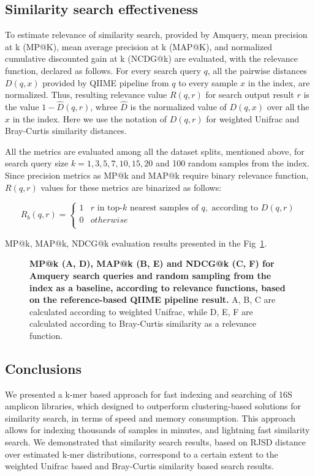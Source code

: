 \documentclass[10pt,letterpaper]{article}
\begin{document}
\subsection*{Similarity search effectiveness}
To estimate relevance of similarity search, provided by Amquery, mean precision at k (MP@K), mean average precision at k (MAP@K), 
and normalized cumulative discounted gain at k (NCDG@k) \cite{book, jarvelin2000ir, jarvelin2002cumulated}
are evaluated, with the relevance function, declared as follows. 
For every search query $q$, all the pairwise distances $D(q, x)$ provided by QIIME pipeline from $q$ to every sample $x$ 
in the index, are normalized. 
Thus, resulting relevance value $R(q, r)$ for search output result $r$ is the value $1 - \hat{D}(q, r)$, whree $\hat{D}$ 
is the normalized value of $D(q, x)$ over all the $x$ in the index. Here we use the notation of $D(q, r)$ for weighted Unifrac 
and Bray-Curtis similarity distances.

All the metrics are evaluated among all the dataset splits, mentioned above, for search query size $k = {1, 3, 5, 7, 10, 15, 20}$ 
and 100 random samples from the index. Since precision metrics as MP@k and MAP@k require binary relevance function,
$R(q, r)$ values for these metrics are binarized as follows:

\[ R_b(q, r)  =
  \begin{cases}
    1  & r \text{ in top-} k \text{ nearest samples of } q, \text{ according to } D(q, r)\\
    0  &  otherwise \\
  \end{cases}
\] 

MP@k, MAP@k, NDCG@k evaluation results presented in the Fig~\ref{fig5}.


\begin{figure}[!h]
\caption{{\bf MP@k (A, D), MAP@k (B, E) and NDCG@k (C, F) for Amquery search queries and random sampling from the index as a baseline, according to relevance functions, based on the reference-based QIIME pipeline result.}
A, B, C are calculated according to weighted Unifrac, while D, E, F are calculated according to Bray-Curtis similarity as a relevance function.}
\label{fig5}
\end{figure}


\subsection*{Conclusions}
We presented a k-mer based approach for fast indexing and searching of 16S amplicon libraries, which designed to outperform clustering-based solutions for similarity search, in terms of speed and memory consumption.
This approach allows for indexing thousands of samples in minutes, and lightning fast similarity search. We demonstrated that similarity search results, based on RJSD distance over estimated k-mer distributions, correspond to a certain extent to the weighted Unifrac based and Bray-Curtis similarity based search results.
\end{document}
